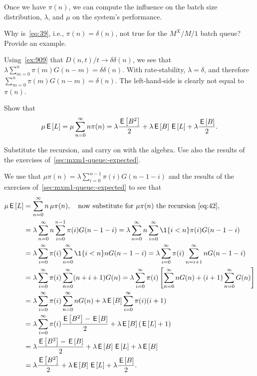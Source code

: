 \documentclass[companion]{subfiles}
\begin{document}
Once we have $\pi(n)$, we can compute the influence on the batch size distribution, $\lambda$, and $\mu$ on the system's performance.

\begin{exercise}
 Why is~\cref{eq:39}, i.e., $\pi(n)=\delta(n)$, not true for the $M^X/M/1$ batch queue?
 Provide an example.
\begin{solution}
Using~\cref{ex:909} that $D(n,t)/t \to \delta \delta(n)$, we see that
$\lambda \sum_{m=0}^n \pi(m) G(n-m) = \delta \delta(n)$. With rate-stability, $\lambda=\delta$, and therefore 
$\sum_{m=0}^n \pi(m) G(n-m) = \delta(n)$. The left-hand-side is clearly not equal to $\pi(n)$. 
\end{solution}
\end{exercise}


\begin{extra}
 Show that
\begin{equation}\label{eq:67}
 \mu \,\mathsf{E}\left[L\right] =\mu \sum_{n=0}^\infty n \pi(n) = \lambda \frac{\,\mathsf{E}\left[B^2\right]}2 + \lambda \,\mathsf{E}\left[B\right] \,\mathsf{E}\left[L\right] +\lambda \frac{\,\mathsf{E}\left[B\right]}2.
\end{equation}
\begin{hint}
 Substitute the recursion, and carry on with the algebra.
 Use also the results of the exercises of~\cref{sec:mxm1-queue:-expected}.
\end{hint}
\begin{solution}
 We use that $\mu \pi(n) =\lambda \sum_{i=0}^{n-1} \pi(i) G(n-1-i)$ and the results of the exercises of~\cref{sec:mxm1-queue:-expected} to see that
\begin{align*}
 \mu \E L
 &=\sum_{n=0}^\infty n\, \mu \pi(n), \quad \text{now substitute for $\mu \pi(n)$ the recursion~\cref{eq:42}}, \\
& =\lambda \sum_{n=0}^\infty n \sum_{i=0}^{n-1} \pi(i) G(n-1-i) 
 =\lambda \sum_{n=0}^\infty n \sum_{i=0}^\infty \1{i<n} \pi(i) G(n-1-i) \\
& =\lambda \sum_{i=0}^\infty \pi(i) \sum_{n=0}^\infty \1{i<n} n G(n-1-i) 
 =\lambda \sum_{i=0}^\infty \pi(i) \sum_{n=i+1}^\infty n G(n-1-i) \\
& =\lambda \sum_{i=0}^\infty \pi(i) \sum_{n=0}^\infty (n+i+1) G(n) 
 =\lambda \sum_{i=0}^\infty \pi(i) \left[\sum_{n=0}^\infty n G(n) +(i+1) \sum_{n=0}^\infty G(n)\right] \\
 &=\lambda \sum_{i=0}^\infty \pi(i)\sum_{n=0}^\infty n G(n) +\lambda \E B \sum_{i=0}^\infty \pi(i) (i+1) \\ 
 &=\lambda \sum_{i=0}^\infty \pi(i) \frac{\E{B^2} -\E B}2 + \lambda \E B (\E L +1) \\ 
 &= \lambda \frac{\E{B^2} -\E B}2 + \lambda \E B \E L +\lambda \E B \\
 &= \lambda \frac{\E{B^2} }2 + \lambda \E B \E L +\lambda \frac{\E B}2.
\end{align*}
\end{solution}
\end{extra}
\end{document}
